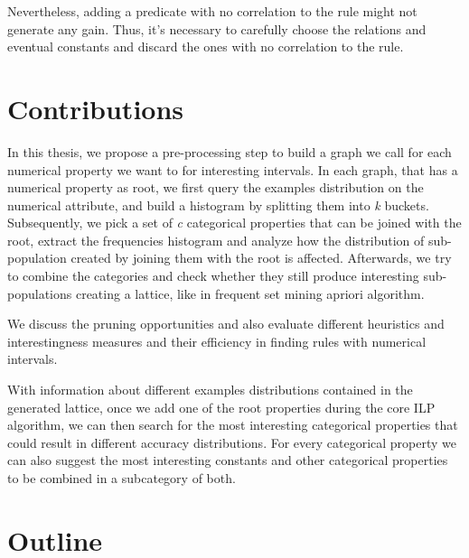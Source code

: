 Nevertheless, adding a predicate with no correlation to the rule might not generate any gain. Thus, it's necessary to
carefully choose the relations and eventual constants and discard the ones with no correlation to the rule.  

\section{Contributions}
In this thesis, we propose a pre-processing step to build a graph we call \graphname for each numerical property we want
to for interesting intervals. In each graph, that has a numerical property as root, we first query the examples
distribution on the numerical attribute, and build a histogram by splitting them into \emph{k} buckets. Subsequently, we
pick a set of \emph{c} categorical properties that can be joined with the root, extract the frequencies histogram and
analyze how the distribution of sub-population created by joining them with the root is affected. Afterwards, we try to
combine the categories and check whether they still produce interesting sub-populations creating a lattice, like in
frequent set mining apriori algorithm.

We discuss the pruning opportunities and also evaluate different heuristics and interestingness measures and their
efficiency in finding rules with numerical intervals. 

\begin{comment}
In a clause containing a numerical attribute in the body, we can obtain a support and accuracy as well as support value
for each of the buckets. Therewith, we can search the most interesting intervals that satisfies the support and accuracy
thresholds
\end{comment}

With information about different examples distributions contained in the generated lattice, once we add one of the root
properties during the core ILP algorithm, we can then search for the most interesting categorical properties that could
result in different accuracy distributions. For every categorical property we can also suggest the most interesting
constants and other categorical properties to be combined in a subcategory of both.

\section{Outline}

